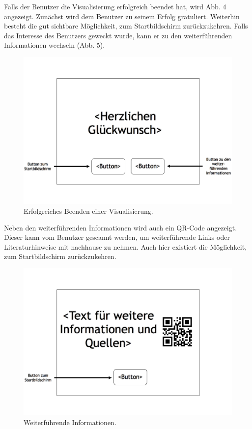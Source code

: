 \documentclass{article}
\begin{document}
Falls der Benutzer die Visualisierung erfolgreich beendet hat, wird Abb. 4 angezeigt. Zunächst wird dem Benutzer zu seinem Erfolg gratuliert. Weiterhin besteht die gut sichtbare Möglichkeit, zum Startbildschirm zurückzukehren. Falls das Interesse des Benutzers geweckt wurde, kann er zu den weiterführenden Informationen wechseln (Abb. 5).

\begin{figure}[H]
  \centering
    \includegraphics[width=\textwidth]{resources/ui_walkthrough_end-draft}
  \caption{Erfolgreiches Beenden einer Visualisierung.}
\end{figure}

Neben den weiterführenden Informationen wird auch ein QR-Code angezeigt. Dieser kann vom Benutzer gescannt werden, um weiterführende Links oder Literaturhinweise mit nachhause zu nehmen. Auch hier existiert die Möglichkeit, zum Startbildschirm zurückzukehren.

\begin{figure}[H]
  \centering
    \includegraphics[width=\textwidth]{resources/ui_walkthrough_other}
  \caption{Weiterführende Informationen.}
\end{figure}
\end{document}
